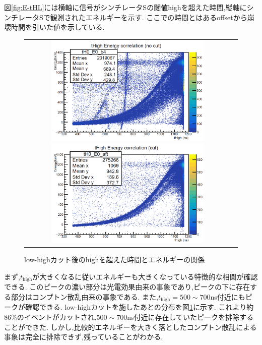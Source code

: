 図\ref{fig:E-tHL}には横軸に信号がシンチレータSの閾値highを超えた時間,縦軸にシンチレータSで観測されたエネルギーを示す.
ここでの時間とはあるoffsetから崩壊時間を引いた値を示している.
\begin{figure}[tbp]
	\begin{tabular}{cc}
		\begin{minipage}[t]{0.5\hsize}
			\centering
				\includegraphics[width=80mm]{fig/isb/E-tHL.pdf}
				\caption{low-highカット前の閾値highを超えた時間とエネルギーの関係}
				\label{fig:E-tHL}
		\end{minipage}
		\begin{minipage}[t]{0.5\hsize}
			\centering
				\includegraphics[width=80mm]{fig/isb/E-tHL_cut.pdf}
				\caption{low-highカット後のhighを超えた時間とエネルギーの関係}
				\label{fig:E-tHL_cut}
		\end{minipage}
	\end{tabular}
\end{figure}
まず,$t_\textrm{high}$が大きくなるに従いエネルギーも大きくなっている特徴的な相関が確認できる.
このピークの濃い部分は光電効果由来の事象であり,ピークの下に存在する部分はコンプトン散乱由来の事象である.
また,$t_\textrm{high}=500\sim700$ns付近にもピークが確認できる.
low-highカットを施したあとの分布を図\ref{fig:E-tHL_cut}に示す.
これより約86\%のイベントがカットされ,$500\sim700$ns付近に存在していたピークを排除することができた.
しかし,比較的エネルギーを大きく落としたコンプトン散乱による事象は完全に排除できず,残っていることがわかる.

